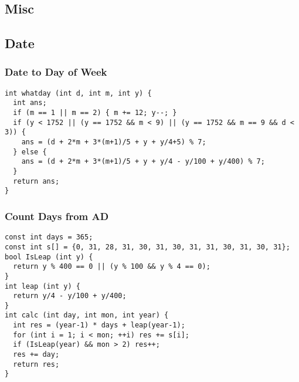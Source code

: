 \documentclass[10pt,landscape]{article}
\begin{document}
\begin{multicols}{2}
\section{Misc}
\subsection{Date}
\subsubsection{Date to Day of Week}
\begin{lstlisting}
int whatday (int d, int m, int y) {
  int ans;
  if (m == 1 || m == 2) { m += 12; y--; }
  if (y < 1752 || (y == 1752 && m < 9) || (y == 1752 && m == 9 && d < 3)) {
    ans = (d + 2*m + 3*(m+1)/5 + y + y/4+5) % 7;
  } else {
    ans = (d + 2*m + 3*(m+1)/5 + y + y/4 - y/100 + y/400) % 7;
  }
  return ans;
}
\end{lstlisting}
\subsubsection{Count Days from AD}
\begin{lstlisting}
const int days = 365;
const int s[] = {0, 31, 28, 31, 30, 31, 30, 31, 31, 30, 31, 30, 31};
bool IsLeap (int y) {
  return y % 400 == 0 || (y % 100 && y % 4 == 0);
}
int leap (int y) {
  return y/4 - y/100 + y/400;
}
int calc (int day, int mon, int year) {
  int res = (year-1) * days + leap(year-1);
  for (int i = 1; i < mon; ++i) res += s[i];
  if (IsLeap(year) && mon > 2) res++;
  res += day;
  return res;
}
\end{lstlisting}

\end{multicols}
\end{document}
